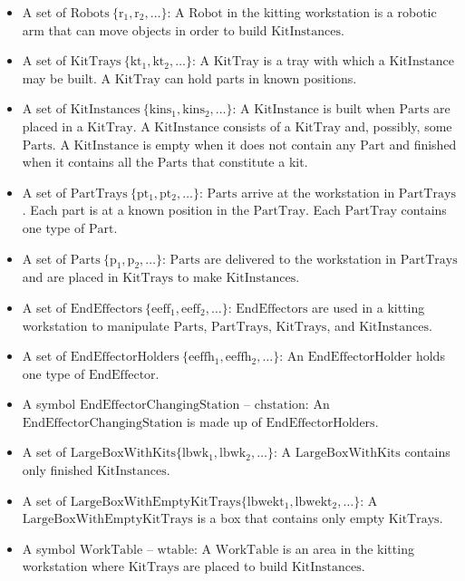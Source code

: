 \begin{itemize}
\item A set of $\mathrm{Robots\ \lbrace r_1, r_2,\dots \rbrace}$: A $\mathrm{Robot}$ in the kitting workstation is a robotic arm that can move objects in order to build $\mathrm{KitInstances}$.

\item A set of $\mathrm{KitTrays\ \lbrace kt_1, kt_2,\dots \rbrace}$: A $\mathrm{KitTray}$ is a tray with which a $\mathrm{KitInstance}$ may be built. A $\mathrm{KitTray}$ can hold parts in known positions.

\item A set of $\mathrm{KitInstances\ \lbrace kins_1, kins_2,\dots \rbrace}$: A $\mathrm{KitInstance}$ is built when $\mathrm{Parts}$ are placed in a $\mathrm{KitTray}$. A $\mathrm{KitInstance}$ consists of a $\mathrm{KitTray}$ and, possibly, some $\mathrm{Parts}$. A $\mathrm{KitInstance}$ is empty when it does not contain any $\mathrm{Part}$ and finished when it contains all the $\mathrm{Parts}$ that constitute a kit.

\item A set of $\mathrm{PartTrays\ \lbrace pt_1, pt_2,\dots \rbrace}$: $\mathrm{Parts}$ arrive at the workstation in $\mathrm{PartTrays}$. Each part is at a known position in the $\mathrm{PartTray}$. Each $\mathrm{PartTray}$ contains one type of $\mathrm{Part}$.

\item A set of $\mathrm{Parts\ \lbrace p_1, p_2,\dots \rbrace}$: $\mathrm{Parts}$ are delivered to the workstation in $\mathrm{PartTrays}$ and are placed in $\mathrm{KitTrays}$ to make $\mathrm{KitInstances}$.

\item A set of $\mathrm{EndEffectors\ \lbrace eeff_1, eeff_2,\dots \rbrace}$: $\mathrm{EndEffectors}$ are used in a kitting workstation to manipulate $\mathrm{Parts}$, $\mathrm{PartTrays}$, $\mathrm{KitTrays}$, and $\mathrm{KitInstances}$.

\item A set of $\mathrm{EndEffectorHolders\ \lbrace eeffh_1, eeffh_2,\dots \rbrace}$: An $\mathrm{EndEffectorHolder}$ holds one type of $\mathrm{EndEffector}$.

\item A symbol $\mathrm{EndEffectorChangingStation}$ -- $\mathrm{chstation}$: An $\mathrm{EndEffectorChangingStation}$ is made up of $\mathrm{EndEffectorHolders}$.

\item A set of $\mathrm{LargeBoxWithKits \lbrace lbwk_1, lbwk_2,\dots \rbrace}$: A $\mathrm{LargeBoxWithKits}$ contains only finished $\mathrm{KitInstances}$.

\item A set of $\mathrm{LargeBoxWithEmptyKitTrays \lbrace lbwekt_1, lbwekt_2,\dots \rbrace}$: A $\mathrm{LargeBoxWithEmptyKitTrays}$ is a box that contains only empty $\mathrm{KitTrays}$.

\item A symbol $\mathrm{WorkTable}$ -- $\mathrm{wtable}$: A $\mathrm{WorkTable}$ is an area in the kitting workstation where $\mathrm{KitTrays}$ are placed to build $\mathrm{KitInstances}$.
\end{itemize}



